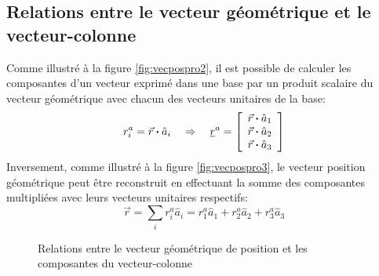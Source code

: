 \subsection{Relations entre le vecteur géométrique et le vecteur-colonne}

Comme illustré à la figure \ref{fig:vecpospro2}, il est possible de calculer les composantes d'un vecteur exprimé dans une base par un produit scalaire du vecteur géométrique avec chacun des vecteurs unitaires de la base:
\begin{equation}
r_i^a = \vec{r} \boldsymbol{\cdot} \hat{a}_i  \quad \Rightarrow \quad 
\underline{r}^{a} = \left[ \begin{array}{c} \vec{r} \boldsymbol{\cdot} \hat{a}_1 \\ \vec{r} \boldsymbol{\cdot} \hat{a}_2 \\ \vec{r} \boldsymbol{\cdot} \hat{a}_3  \end{array} \right] 
\end{equation} 
Inversement, comme illustré à la figure \ref{fig:vecpospro3}, le vecteur position géométrique peut être reconstruit en effectuant la somme des composantes multipliées avec leurs vecteurs unitaires respectifs:
\begin{equation}
\vec{r} = \sum_{i} r_i^a \hat{a}_i = r_1^a \hat{a}_1 + r_2^a \hat{a}_2 + r_3^a \hat{a}_3%
\end{equation} 
\begin{figure}[htb]
        \centering
				\hspace{+20pt}
        \caption{Relations entre le vecteur géométrique de position et les composantes du vecteur-colonne}
				\label{fig:vecpospro23}
\end{figure}


